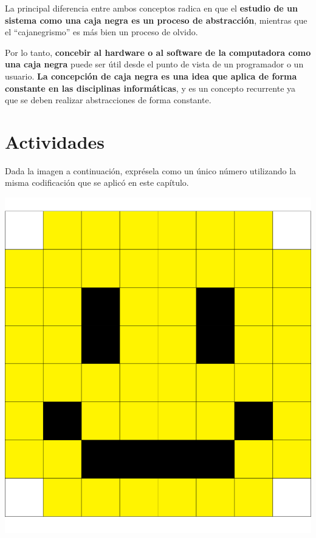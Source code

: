 La principal diferencia entre ambos conceptos radica en que el \textbf{estudio
de un sistema como una caja negra es un proceso de abstracción}, mientras que el
``cajanegrismo'' es más bien un proceso de olvido.

Por lo tanto, \textbf{concebir al hardware o al software de la computadora como
una caja negra} puede ser útil desde el punto de vista de un programador o un
usuario. \textbf{La concepción de caja negra es una idea que aplica de forma
constante en las disciplinas informáticas}, y es un concepto recurrente ya que
se deben realizar abstracciones de forma constante.

\section{Actividades}
\label{chap:bajo_nivel:sec:actividades}

\begin{exercise}
Dada la imagen a continuación, exprésela como un único número utilizando la
misma codificación que se aplicó en este capítulo.

\centerline{\includegraphics[scale=0.35]{unidades/2_informacion/1_bajo_nivel/imagenes/pixels_smile.png}}
\end{exercise}

